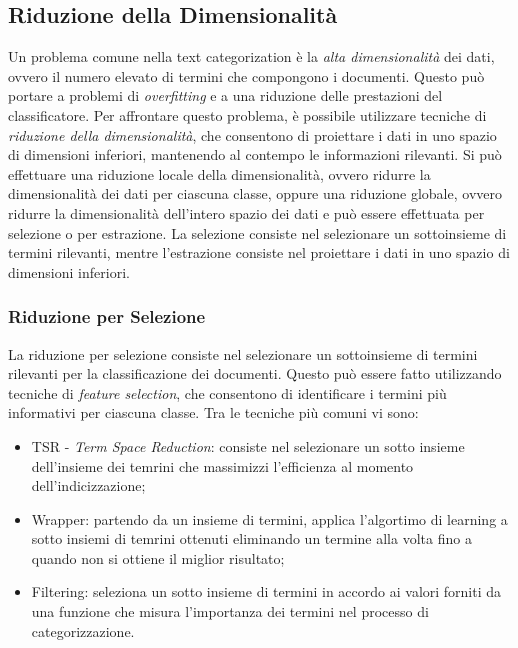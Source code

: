 \documentclass{report}
\begin{document}
	\subsection{Riduzione della Dimensionalità}
	Un problema comune nella text categorization è la \textit{alta dimensionalità} dei dati, ovvero il numero elevato di termini che compongono i documenti. Questo può portare a problemi di \textit{overfitting} e a una riduzione delle prestazioni del classificatore. Per affrontare questo problema, è possibile utilizzare tecniche di \textit{riduzione della dimensionalità}, che consentono di proiettare i dati in uno spazio di dimensioni inferiori, mantenendo al contempo le informazioni rilevanti. Si può effettuare una riduzione locale della dimensionalità, ovvero ridurre la dimensionalità dei dati per ciascuna classe, oppure una riduzione globale, ovvero ridurre la dimensionalità dell'intero spazio dei dati e può essere effettuata per selezione o per estrazione. La selezione consiste nel selezionare un sottoinsieme di termini rilevanti, mentre l'estrazione consiste nel proiettare i dati in uno spazio di dimensioni inferiori.
	
	\subsubsection{Riduzione per Selezione}
	La riduzione per selezione consiste nel selezionare un sottoinsieme di termini rilevanti per la classificazione dei documenti. Questo può essere fatto utilizzando tecniche di \textit{feature selection}, che consentono di identificare i termini più informativi per ciascuna classe. Tra le tecniche più comuni vi sono:
	\begin{itemize}
		\item TSR - \textit{Term Space Reduction}: consiste nel selezionare un sotto insieme dell'insieme dei temrini che massimizzi l'efficienza al momento dell'indicizzazione;
		\item Wrapper: partendo da un insieme di termini, applica l'algortimo di learning a sotto insiemi di temrini ottenuti eliminando un termine alla volta fino a quando non si ottiene il miglior risultato;
		\item Filtering: seleziona  un sotto insieme di termini in accordo ai valori forniti da una funzione che misura l'importanza dei termini nel processo di categorizzazione.
	\end{itemize}
\end{document}
